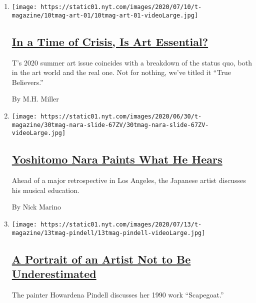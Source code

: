 \begin{enumerate}
\def\labelenumi{\arabic{enumi}.}
\item
  \texttt{[image: https://static01.nyt.com/images/2020/07/10/t-magazine/10tmag-art-01/10tmag-art-01-videoLarge.jpg]}

  \hypertarget{in-a-time-of-crisis-is-art-essential-1}{%
  \subsection{\texorpdfstring{\href{/2020/07/20/t-magazine/museums-galleries-open-art.html}{In
  a Time of Crisis, Is Art
  Essential?}}{In a Time of Crisis, Is Art Essential?}}\label{in-a-time-of-crisis-is-art-essential-1}}

  T's 2020 summer art issue coincides with a breakdown of the status
  quo, both in the art world and the real one. Not for nothing, we've
  titled it ``True Believers.''

  By M.H. Miller
\item
  \texttt{[image: https://static01.nyt.com/images/2020/06/30/t-magazine/30tmag-nara-slide-67ZV/30tmag-nara-slide-67ZV-videoLarge.jpg]}

  \hypertarget{yoshitomo-nara-paints-what-he-hears-1}{%
  \subsection{\texorpdfstring{\href{/2020/07/24/t-magazine/yoshitomo-nara.html}{Yoshitomo
  Nara Paints What He
  Hears}}{Yoshitomo Nara Paints What He Hears}}\label{yoshitomo-nara-paints-what-he-hears-1}}

  Ahead of a major retrospective in Los Angeles, the Japanese artist
  discusses his musical education.

  By Nick Marino
\item
  \texttt{[image: https://static01.nyt.com/images/2020/07/13/t-magazine/13tmag-pindell/13tmag-pindell-videoLarge.jpg]}

  \hypertarget{a-portrait-of-an-artist-not-to-be-underestimated-1}{%
  \subsection{\texorpdfstring{\href{/2020/07/24/t-magazine/howardena-pindell.html}{A
  Portrait of an Artist Not to Be
  Underestimated}}{A Portrait of an Artist Not to Be Underestimated}}\label{a-portrait-of-an-artist-not-to-be-underestimated-1}}

  The painter Howardena Pindell discusses her 1990 work ``Scapegoat.''


\end{enumerate}
